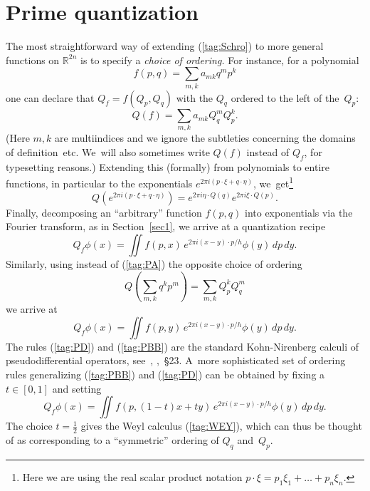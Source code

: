\documentclass[12pt]{amsart}
\numberwithin{equation}{section}
\theoremstyle{remark}
\newcommand\RR{\mathbb R}
\begin{document}
\section{Prime quantization} \label{sec5}
The most straightforward way of extending (\ref{tag:Schro}) to more general
functions on $\RR^{2n}$ is to specify a {\it choice of ordering.\/} For
instance, for a polynomial
\begin{equation}  f(p,q)= \sum_{m,k} a_{mk} q^m p^k  \label{tag:PO}
\end{equation}
one can declare that $Q_f=f(Q_p,Q_q)$ with the $Q_q$ ordered to the left of
the~$Q_p$:
\begin{equation}  Q(f) = \sum_{m,k} a_{mk} Q^m_q Q^k_p.  \label{tag:PA}
\end{equation}
(Here $m,k$ are multiindices and we ignore the subtleties concerning the
domains of definition~etc. We~will also sometimes write $Q(f)$ instead of
$Q_f$, for typesetting reasons.) Extending this (formally) from polynomials to
entire functions, in particular to the exponentials $e^{2\pi
i(p\cdot\xi+q\cdot\eta)}$, we~get\footnote{Here we are using the real scalar
product notation $p\cdot\xi=p_1\xi_1+\dots+p_n\xi_n$.}
$$ Q(e^{2\pi i(p\cdot\xi+q\cdot\eta)})
= e^{2\pi i \eta \cdot Q(q)} e^{2\pi i \xi\cdot Q(p)}.  $$
Finally, decomposing an ``arbitrary'' function $f(p,q)$ into exponentials via
the Fourier transform, as in Section~\ref{sec1}, we arrive at a quantization
recipe
\begin{equation}  Q_f \phi(x) = \iint f(p,x) \,e^{2\pi i(x-y)\cdot p /h}
\phi(y) \,d p \,dy. \label{tag:PBB}  \end{equation}
Similarly, using instead of (\ref{tag:PA}) the opposite choice of ordering
\begin{equation}  Q(\sum_{m,k} q^k p^m) = \sum_{m,k} Q_p^k Q_q^m
\label{tag:PC}  \end{equation}
we arrive at
\begin{equation}  Q_f \phi(x) = \iint f(p,y) \,e^{2\pi i(x-y)\cdot p /h}
\phi(y) \,d p \,dy. \label{tag:PD}  \end{equation}
The rules (\ref{tag:PD}) and (\ref{tag:PBB}) are the standard Kohn-Nirenberg
calculi of pseudodifferential operators, see~\cite{bib:KN},
\cite{bib:Foll},~\S23. A~more sophisticated set of ordering rules generalizing
(\ref{tag:PBB}) and (\ref{tag:PD}) can be obtained by fixing a $t\in[0,1]$ and
setting
\begin{equation}  Q_f \phi(x) = \iint f(p,(1-t)x+ty)\,e^{2\pi i(x-y)\cdot p /h}
\phi(y)  \,d p \,dy.  \label{tag:PU}  \end{equation}
The choice $t=\frac12$ gives the Weyl calculus (\ref{tag:WEY}), which can thus
be thought of as corresponding to a ``symmetric'' ordering of $Q_q$ and~$Q_p$.
\end{document}
